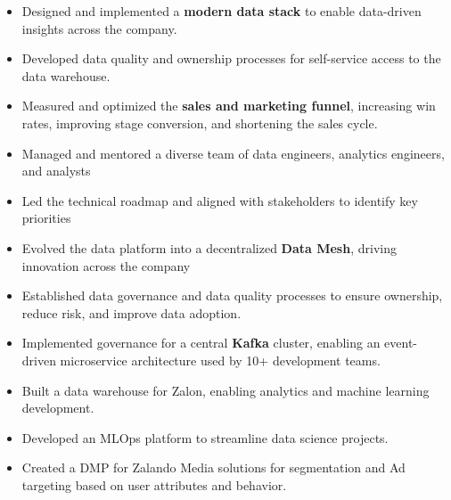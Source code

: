 \documentclass[10pt,a4paper,ragged2e,withhyper]{altacv}
\begin{document}
\begin{paracol}{2}


\begin{itemize}
  \item Designed and implemented a \textbf{modern data stack} to enable data-driven insights across the company.
  \item Developed data quality and ownership processes for self-service access to the data warehouse.
  \item Measured and optimized the \textbf{sales and marketing funnel}, increasing win rates, improving stage conversion, and shortening the sales cycle.
\end{itemize}

\divider

\begin{itemize}
  \item Managed and mentored a diverse team of data engineers, analytics engineers, and analysts
  \item Led the technical roadmap and aligned with stakeholders to identify key priorities
  \item Evolved the data platform into a decentralized \textbf{Data Mesh}, driving innovation across the company
  \item Established data governance and data quality processes to ensure ownership, reduce risk, and improve data adoption.
  \item Implemented governance for a central \textbf{Kafka} cluster, enabling an event-driven microservice architecture used by 10+ development teams.
\end{itemize}

\divider

\begin{itemize}
  \item Built a data warehouse for Zalon, enabling analytics and machine learning development.
  \item Developed an MLOps platform to streamline data science projects.
  \item Created a DMP for Zalando Media solutions for segmentation and Ad targeting based on user attributes and behavior.
\end{itemize}



\end{paracol}
\end{document}
